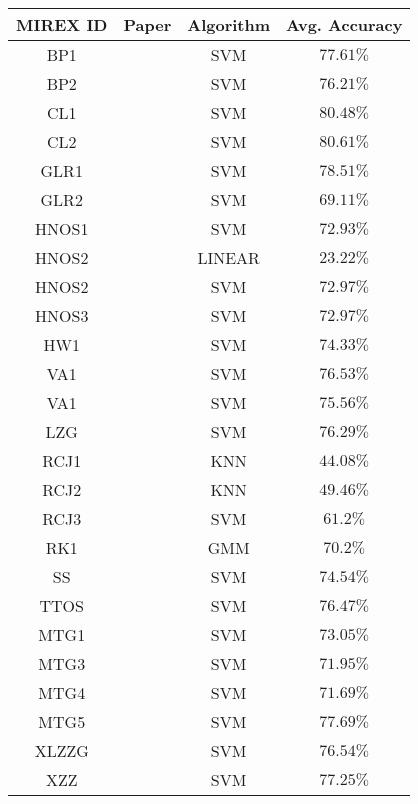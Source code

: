 \newpage


\begin{center}

  \begin{tabularx}{\textwidth}{c|X|c|c}

    \textbf{MIREX ID} & \textbf{Paper} & \textbf{Algorithm} & \textbf{Avg. Accuracy} \\
    \hline

    BP1 & \citet{bp_2009} & SVM & $77.61\%$ \\
    BP2 & \citet{bp_2009} & SVM & $76.21\%$ \\
    CL1 & \citet{cl_2009} & SVM & $80.48\%$ \\
    CL2 & \citet{cl_2009} & SVM & $80.61\%$ \\
    GLR1 & \citet{glr_2009} & SVM & $78.51\%$ \\
    GLR2 & \citet{glr_2009} & SVM & $69.11\%$ \\
    HNOS1 & \citet{hnos_2009} & SVM & $72.93\%$ \\
    HNOS2 & \citet{hnos_2009} & LINEAR & $23.22\%$ \\
    HNOS2 & \citet{hnos_2009} & SVM & $72.97\%$ \\
    HNOS3 & \citet{hnos_2009} & SVM & $72.97\%$ \\
    HW1 & \citet{hw_2009} & SVM & $74.33\%$ \\
    VA1 & \citet{va_2009} & SVM & $76.53\%$ \\
    VA1 & \citet{va_2009} & SVM & $75.56\%$ \\
    LZG & \citet{lzg_2009} & SVM & $76.29\%$ \\
    RCJ1 & \citet{rcj_2009} & KNN & $44.08\%$ \\
    RCJ2 & \citet{rcj_2009} & KNN & $49.46\%$ \\
    RCJ3 & \citet{rcj_2009} & SVM & $61.2\%$ \\
    RK1 & \citet{rk_2009} & GMM & $70.2\%$ \\
    SS & \citet{rk_2009} & SVM & $74.54\%$ \\
    TTOS & \citet{ttos_2009} & SVM & $76.47\%$ \\
    MTG1 & \citet{mtg_2009} & SVM & $73.05\%$ \\
    MTG3 & \citet{mtg_2009} & SVM & $71.95\%$ \\
    MTG4 & \citet{mtg_2009} & SVM & $71.69\%$ \\
    MTG5 & \citet{mtg_2009} & SVM & $77.69\%$ \\
    XLZZG & \citet{xlzzg_2009} & SVM & $76.54\%$ \\
    XZZ & \citet{xzz_2009} & SVM & $77.25\%$ \\

  \end{tabularx}

  \label{tab:mirex2009}

\end{center}

